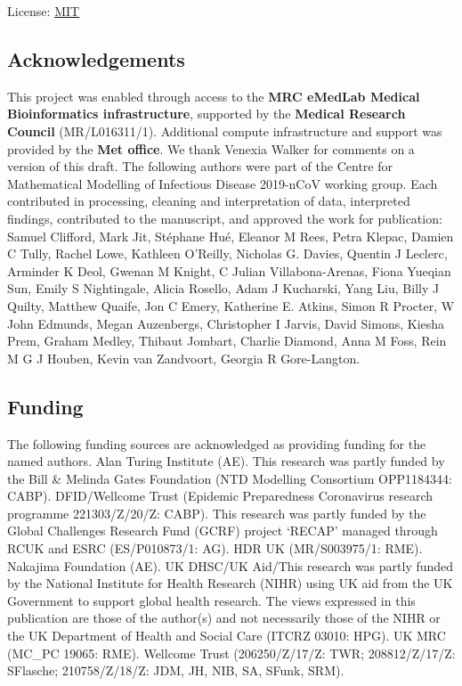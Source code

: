 \documentclass[
]{article}
\begin{document}
License: \href{https://opensource.org/licenses/MIT}{MIT}

\hypertarget{acknowledgements}{%
\subsection{Acknowledgements}\label{acknowledgements}}

This project was enabled through access to the \textbf{MRC eMedLab
Medical Bioinformatics infrastructure}, supported by the \textbf{Medical
Research Council} (MR/L016311/1). Additional compute infrastructure and
support was provided by the \textbf{Met office}. We thank Venexia Walker
for comments on a version of this draft. The following authors were part
of the Centre for Mathematical Modelling of Infectious Disease 2019-nCoV
working group. Each contributed in processing, cleaning and
interpretation of data, interpreted findings, contributed to the
manuscript, and approved the work for publication: Samuel Clifford, Mark
Jit, Stéphane Hué, Eleanor M Rees, Petra Klepac, Damien C Tully, Rachel
Lowe, Kathleen O'Reilly, Nicholas G. Davies, Quentin J Leclerc, Arminder
K Deol, Gwenan M Knight, C Julian Villabona-Arenas, Fiona Yueqian Sun,
Emily S Nightingale, Alicia Rosello, Adam J Kucharski, Yang Liu, Billy J
Quilty, Matthew Quaife, Jon C Emery, Katherine E. Atkins, Simon R
Procter, W John Edmunds, Megan Auzenbergs, Christopher I Jarvis, David
Simons, Kiesha Prem, Graham Medley, Thibaut Jombart, Charlie Diamond,
Anna M Foss, Rein M G J Houben, Kevin van Zandvoort, Georgia R
Gore-Langton.

\hypertarget{funding}{%
\subsection{Funding}\label{funding}}

The following funding sources are acknowledged as providing funding for
the named authors. Alan Turing Institute (AE). This research was partly
funded by the Bill \& Melinda Gates Foundation (NTD Modelling Consortium
OPP1184344: CABP). DFID/Wellcome Trust (Epidemic Preparedness
Coronavirus research programme 221303/Z/20/Z: CABP). This research was
partly funded by the Global Challenges Research Fund (GCRF) project
`RECAP' managed through RCUK and ESRC (ES/P010873/1: AG). HDR UK
(MR/S003975/1: RME). Nakajima Foundation (AE). UK DHSC/UK Aid/This
research was partly funded by the National Institute for Health Research
(NIHR) using UK aid from the UK Government to support global health
research. The views expressed in this publication are those of the
author(s) and not necessarily those of the NIHR or the UK Department of
Health and Social Care (ITCRZ 03010: HPG). UK MRC (MC\_PC 19065: RME).
Wellcome Trust (206250/Z/17/Z: TWR; 208812/Z/17/Z: SFlasche;
210758/Z/18/Z: JDM, JH, NIB, SA, SFunk, SRM).
\end{document}
